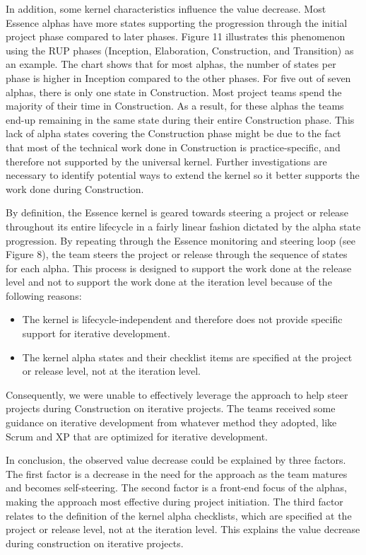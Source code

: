 In addition, some kernel characteristics influence the value decrease. Most Essence alphas have more states supporting the progression through the initial project phase compared to later phases. Figure 11 illustrates this phenomenon using the RUP \cite{KrollRUP} phases (Inception, Elaboration, Construction, and Transition) as an example. The chart shows that for most alphas, the number of states per phase is higher in Inception compared to the other phases. For five out of seven alphas, there is only one state in Construction. Most project teams spend the majority of their time in Construction. As a result, for these alphas the teams end-up remaining in the same state during their entire Construction phase. This lack of alpha states covering the Construction phase might be due to the fact that most of the technical work done in Construction is practice-specific, and therefore not supported by the universal kernel. Further investigations are necessary to identify potential ways to extend the kernel so it better supports the work done during Construction.

By definition, the Essence kernel is geared towards steering a project or release throughout its entire lifecycle in a fairly linear fashion dictated by the alpha state progression. By repeating through the Essence monitoring and steering loop (see Figure 8), the team steers the project or release through the sequence of states for each alpha. This process is designed to support the work done at the release level and not to support the work done at the iteration level because of the following reasons:

\begin{itemize}
    \item The kernel is lifecycle-independent and therefore does not provide specific support for iterative development.
    
    \item The kernel alpha states and their checklist items are specified at the project or release level, not at the iteration level.
\end{itemize}

Consequently, we were unable to effectively leverage the approach to help steer projects during Construction on iterative projects. The teams received some guidance on iterative development from whatever method they adopted, like Scrum and XP that are optimized for iterative development.

In conclusion, the observed value decrease could be explained by three factors. The first factor is a decrease in the need for the approach as the team matures and becomes self-steering. The second factor is a front-end focus of the alphas, making the approach most effective during project initiation. The third factor relates to the definition of the kernel alpha checklists, which are specified at the project or release level, not at the iteration level. This explains the value decrease during construction on iterative projects.

